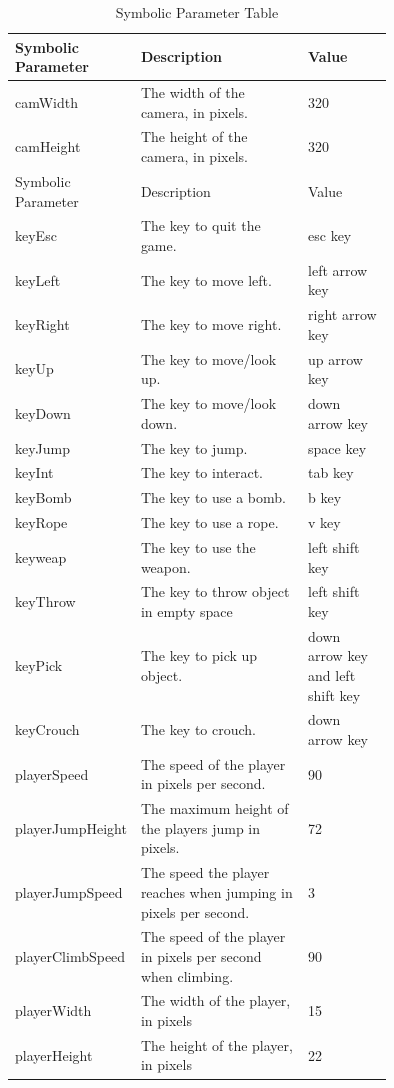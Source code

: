 \documentclass[12pt, titlepage]{article}
\begin{document}
\begin{longtable}{|l|p{0.5\linewidth}|p{0.25\linewidth}|}
\caption{Symbolic Parameter Table}\\
\hline
Symbolic Parameter & Description & Value\\
\hline
camWidth & The width of the camera, in pixels. & 320\\
\hline
camHeight & The height of the camera, in pixels. & 320\\

\hline
Symbolic Parameter & Description & Value\\
\hline
keyEsc & The key to quit the game. & esc key\\
\hline
keyLeft & The key to move left. & left arrow key\\
\hline
keyRight & The key to move right. & right arrow key\\
\hline
keyUp & The key to move/look up. & up arrow key\\
\hline
keyDown & The key to move/look down. & down arrow key\\
\hline
keyJump & The key to jump. & space key\\
\hline
keyInt & The key to interact. & tab key\\
\hline
keyBomb & The key to use a bomb. & b key\\
\hline
keyRope & The key to use a rope. & v key\\
\hline
keyweap & The key to use the weapon. & left shift key\\
\hline
keyThrow & The key to throw object in empty space & left shift key\\
\hline
keyPick & The key to pick up object. & down arrow key and left shift key\\
\hline
keyCrouch & The key to crouch. & down arrow key\\
\hline


playerSpeed & The speed of the player in pixels per second. & 90\\
\hline
playerJumpHeight & The maximum height of the players jump in pixels. & 72\\
\hline
playerJumpSpeed & The speed the player reaches when jumping in pixels per second. & 3\\
\hline
playerClimbSpeed & The speed of the player in pixels per second when climbing. & 90\\
\hline

playerWidth & The width of the player, in pixels & 15\\
\hline
playerHeight & The height of the player, in pixels & 22\\
\hline


\end{longtable}
\end{document}
